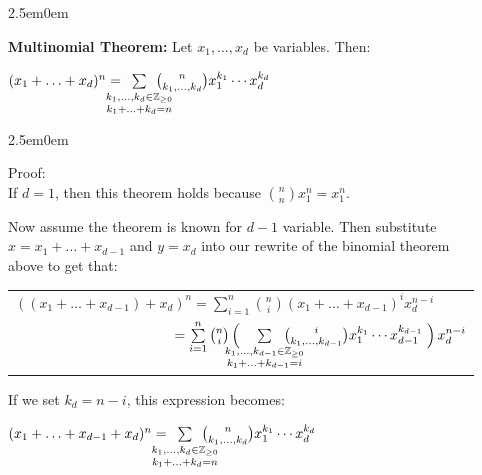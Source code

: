 \documentclass{book}
\newcommand{\hTwo}{%
\color{MidnightBlue}%
   \fontsize{13}{15}\selectfont%
}
\newcommand{\hThree}{%
   \color{PineGreen!85!Orange}
   \fontsize{12}{14}\selectfont%
}
\newenvironment{myIndent}{%
   \begin{adjustwidth}{2.5em}{0em}%
}{%
   \end{adjustwidth}%
}
\newcommand{\blab}[1]{\textbf{#1}}
\newcommand{\retTwo}{\hfill\bigbreak}
\begin{document}
\begin{myIndent}\hTwo
   \blab{Multinomial Theorem:} Let $x_1, \ldots, x_d$ be variables. Then:

   {\centering $(x_1 + \ldots + x_d)^n = \hspace{-1.5em}\sum\limits_{
   \begin{smallmatrix}
      \\
      k_1, \ldots, k_d \in \mathbb{Z}_{\geq 0} \\
      k_1 + \ldots + k_d = n
   \end{smallmatrix}}\hspace{-1.5em}\binom{n}{k_1, \ldots, k_d}x_1^{k_1}\cdots x_d^{k_d}$ \retTwo\par}

   \begin{myIndent}\hThree
      Proof:\\
      If $d = 1$, then this theorem holds because $\binom{n}{n}x_1^n = x_1^n$.\retTwo

      Now assume the theorem is known for $d - 1$ variable. Then substitute \\ $x = x_1 + \ldots + x_{d-1}$ and $y = x_d$ into our rewrite of the binomial theorem\\ above to get that:

      {\centering 
      \begin{tabular}{l}
         $((x_1 + \ldots + x_{d-1}) + x_d)^n = \sum\limits_{i=1}^n \binom{n}{i}(x_1 + \ldots + x_{d-1})^ix_d^{n-i} $\\ [13pt]
         $\phantom{((x_1 + \ldots + x_{d-1}) + x_d)^n} =  \sum\limits_{i=1}^n \binom{n}{i} \left(\vphantom{\int_|^|}\right. \hspace{-1.5em}\sum\limits_{
            \begin{smallmatrix}
               \\
               k_1, \ldots, k_{d-1} \in \mathbb{Z}_{\geq 0} \\
               k_1 + \ldots + k_{d-1} = i
            \end{smallmatrix}}\hspace{-1.75em}\binom{i}{k_1, \ldots, k_{d-1}}x_1^{k_1}\cdots x_{d-1}^{k_{d-1}} \left.\vphantom{\int_|^|}\right) x_d^{n-i} $
      \end{tabular} \newpage\par}

      If we set $k_d = n - i$, this expression becomes:

      {\centering $(x_1 + \ldots + x_{d-1} + x_d)^n = \hspace{-1.5em}\sum\limits_{\begin{smallmatrix}
               \\
               k_1, \ldots, k_{d} \in \mathbb{Z}_{\geq 0} \\
               k_1 + \ldots + k_{d} = n
            \end{smallmatrix}}\hspace{-1.5em}\binom{n}{k_1, \ldots, k_{d}}x_1^{k_1}\cdots x_{d}^{k_{d}}$\retTwo\par}
   \end{myIndent}
\end{myIndent}
\end{document}
